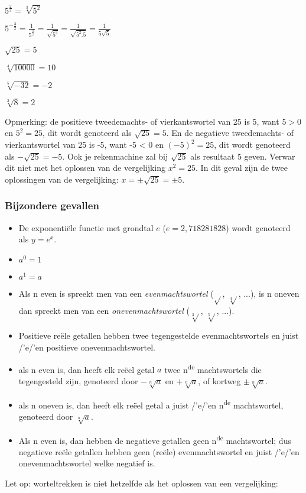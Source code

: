 ${\displaystyle 5^{\frac{2}{3}}=\sqrt[3]{5^{2}}}$

${\displaystyle 5^{-\frac{3}{2}}=\frac{1}{5^{\frac{3}{2}}}=\frac{1}{\sqrt{5^{3}}}=\frac{1}{\sqrt{5^{2}.5}}=\frac{1}{5\sqrt{5}}}$

${\displaystyle \sqrt{25}=5}$ 

${\displaystyle \sqrt[4]{10000}=10}$

${\displaystyle \sqrt[5]{-32}=-2}$

${\displaystyle \sqrt[3]{8}=2}$

Opmerking: de positieve tweedemachts- of vierkantswortel van 25 is
5, want $5>0$ en $5^{2}=25$, dit wordt genoteerd als ${\displaystyle \sqrt{25}=5}$.
En de negatieve tweedemachts- of vierkantswortel van 25 is -5, want
-5 < 0 en $(-5)^{2}=25$, dit wordt genoteerd als ${\displaystyle -\sqrt{25}=-5}$.
Ook je rekenmachine zal bij ${\displaystyle \sqrt{25}}$ als resultaat
5 geven. Verwar dit niet met het oplossen van de vergelijking $x^{2}=25$.
In dit geval zijn de twee oplossingen van de vergelijking: $x=\pm\sqrt{25}=\pm5$.


\subsubsection{Bijzondere gevallen}
\begin{itemize}
\item De exponenti\"ele functie met grondtal $e$ ($e=2,718281828$) wordt
genoteerd als ${\displaystyle y=e^{x}}$.
\item ${\displaystyle a^{0}=1}$
\item ${\displaystyle a^{1}=a}$
\item Als n even is spreekt men van een \emph{evenmachtswortel} ($\sqrt{}$,
$\sqrt[4]{}$, ...), is n oneven dan spreekt men van een \emph{onevenmachtswortel}
($\sqrt[3]{}$, $\sqrt[5]{}$, ...).
\item Positieve re\"ele getallen hebben twee tegengestelde evenmachtswortels
en juist /'e/'en positieve onevenmachtswortel.
\item als n even is, dan heeft elk re\"eel getal $a$ twee n\textsuperscript{de}
machtswortels die tegengesteld zijn, genoteerd door ${\displaystyle -\sqrt[n]{a}}$
en ${\displaystyle +\sqrt[n]{a}}$, of kortweg ${\displaystyle \pm\sqrt[n]{a}}$.
\item als n oneven is, dan heeft elk re\"eel getal a juist /'e/'en n\textsuperscript{de}
machtswortel, genoteerd door ${\displaystyle \sqrt[n]{a}}$.
\item Als n even is, dan hebben de negatieve getallen geen n\textsuperscript{de}
machtswortel; dus negatieve re\"ele getallen hebben geen (re\"ele) evenmachtswortel
en juist /'e/'en onevenmachtswortel welke negatief is.
\end{itemize}
Let op: worteltrekken is niet hetzelfde als het oplossen van een vergelijking:

